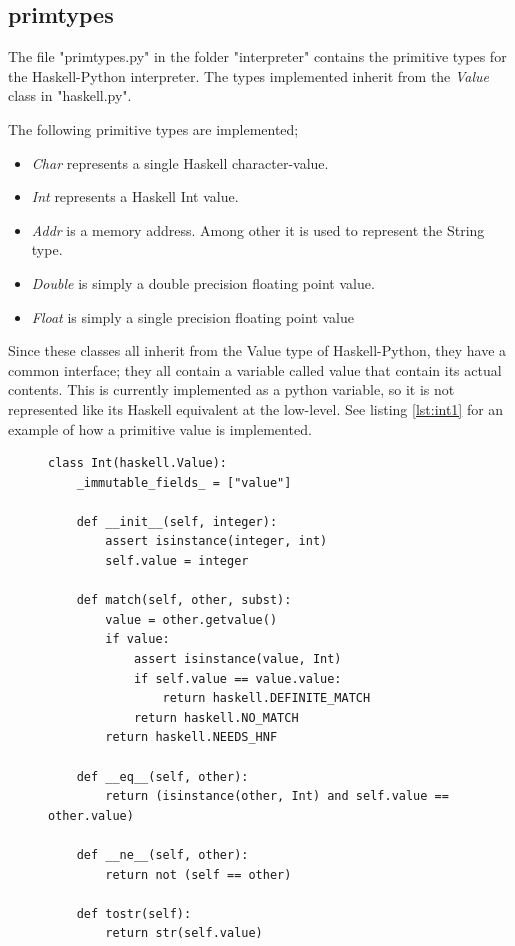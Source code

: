 \subsection{primtypes}

The file "primtypes.py" in the folder "interpreter" contains the primitive types
for the Haskell-Python interpreter. The types implemented inherit from the
\emph{Value} class in "haskell.py".

The following primitive types are implemented;

\begin{itemize}
\item \emph{Char} represents a single Haskell character-value.
\item \emph{Int} represents a Haskell Int value.
\item \emph{Addr} is a memory address. Among other it is used to represent
the String type.

\item \emph{Double} is simply a double precision floating point value.
\item \emph{Float} is simply a single precision floating point value
\end{itemize}

Since these classes all inherit from the Value type of Haskell-Python, 
they have a common interface; they all contain a variable called value that
contain its actual contents. This is currently implemented as a python
variable, so it is not represented like its Haskell equivalent at the low-level.
See listing \ref{lst:int1} for an example of how a primitive value is implemented.

\begin{figure}[H]
\lstset{ %
language=Python,
caption=Python class implementing the Haskell Int Value.,
label=lst:int1
}
\begin{lstlisting}
class Int(haskell.Value):
    _immutable_fields_ = ["value"]

    def __init__(self, integer):
        assert isinstance(integer, int)
        self.value = integer

    def match(self, other, subst):
        value = other.getvalue()
        if value:
            assert isinstance(value, Int)
            if self.value == value.value:
                return haskell.DEFINITE_MATCH
            return haskell.NO_MATCH
        return haskell.NEEDS_HNF

    def __eq__(self, other):
        return (isinstance(other, Int) and self.value == other.value)

    def __ne__(self, other):
        return not (self == other)

    def tostr(self):
        return str(self.value)
\end{lstlisting}
\end{figure}


